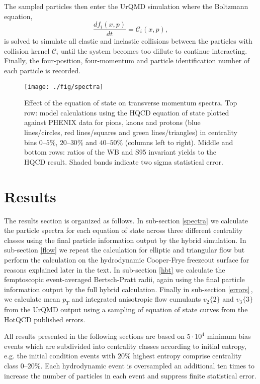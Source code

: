 \documentclass[aps,prc,reprint,amsmath,nofootinbib,superscriptaddress]{revtex4-1}
\begin{document}
The sampled particles then enter the UrQMD simulation where the Boltzmann equation, 
\begin{equation}
 \frac{df_i(x,p)}{dt} = \mathcal{C}_i(x,p),
\end{equation}
is solved to simulate all elastic and inelastic collisions between the particles with collision kernel $\mathcal{C}_i$ until the system becomes too dillute to continue interacting. 
Finally, the four-position, four-momentum and particle identification number of each particle is recorded. 

\begin{figure*}[t]
  \texttt{[image: ./fig/spectra]}
  \caption{
    \label{fig:spectra} Effect of the equation of state on transverse momentum spectra. Top row: model calculations using the HQCD equation of state plotted against 
    PHENIX data for pions, kaons and protons (blue lines/circles, red lines/squares and green lines/triangles) in centrality bins $0$--$5\%$, $20$--$30\%$ and $40$--$50\%$ 
    (columns left to right). Middle and bottom rows: ratios of the WB and S95 invariant yields to the HQCD result. Shaded bands indicate two sigma statistical error. }
\end{figure*}

\section{Results}
\label{results}

The results section is organized as follows. In sub-section \ref{spectra} we calculate the particle spectra for each equation of state across three different centrality classes using the final 
particle information output by the hybrid simulation. In sub-section \ref{flow} we repeat the calculation for elliptic and triangular flow but perform the calculation on the 
hydrodynamic Cooper-Frye freezeout surface for reasons explained later in the text. In sub-section \ref{hbt} we calculate the femptoscopic event-averaged Bertsch-Pratt radii, again using the 
final particle information output by the full hybrid calculation. Finally in sub-section \ref{errors}\,, we calculate mean $p_T$ and integrated anisotropic flow cumulants $v_2\{2\}$ and $v_3\{3\}$ from the UrQMD output using a sampling of equation of state curves from the HotQCD published errors. 

All results presented in the following sections are based on $5\cdot10^4$ minimum bias events which are subdivided into centrality classes according to initial entropy, e.g. the initial condition events with $20\%$ highest entropy comprise centrality class $0$--$20\%$. Each hydrodynamic event is oversampled an additional ten times to increase the number of particles in each event and suppress finite statistical error.
\end{document}
